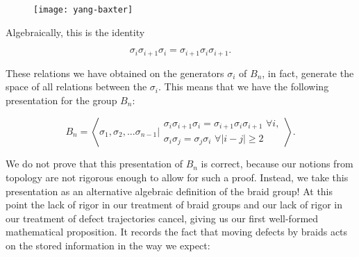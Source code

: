 \begin{figure}
\begin{center}
\texttt{[image: yang-baxter]}
\label{yang-baxter}
\end{center}
\end{figure}

Algebraically, this is the identity

$$\sigma_{i}\sigma_{i+1}\sigma_{i}=\sigma_{i+1}\sigma_{i}\sigma_{i+1}.$$

These relations we have obtained on the generators $\sigma_i$ of $B_n$, in fact, generate the space of all relations between the $\sigma_i$. This means that we have the following presentation for the group $B_n$:

$$B_n=\left<\left.\sigma_1,\sigma_2,...\sigma_{n-1}\right| \substack{ \sigma_{i}\sigma_{i+1}\sigma_{i}=\sigma_{i+1}\sigma_{i}\sigma_{i+1}\,\, \forall i, \\ \sigma_i\sigma_j=\sigma_j\sigma_i \,\,\forall |i-j|\geq 2}\right>.$$

We do not prove that this presentation of $B_n$ is correct, because our notions from topology are not rigorous enough to allow for such a proof. Instead, we take this presentation as an alternative algebraic definition of the braid group! At this point the lack of rigor in our treatment of braid groups and our lack of rigor in our treatment of defect trajectories cancel, giving us our first well-formed mathematical proposition. It records the fact that moving defects by braids acts on the stored information in the way we expect:

